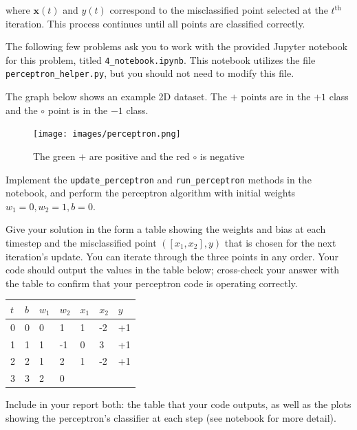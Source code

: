 where $\mathbf{x}(t)$ and $y(t)$ correspond to the misclassified point selected at the $t^\text{th}$ iteration.
This process continues until all points are classified correctly.

The following few problems ask you to work with the provided Jupyter notebook for this problem, titled \texttt{4_notebook.ipynb}. This notebook utilizes the file \texttt{perceptron_helper.py}, but you should not need to modify this file.

\begin{problem}[8]
  The graph below shows an example 2D dataset. The $+$ points are in the $+1$ class and the $\circ$ point is in the $-1$ class. 

  \begin{figure}[H]
    \centering
    \texttt{[image: images/perceptron.png]}
    \caption{The green $+$ are positive and the red $\circ$ is negative}
    \label{fig:figure1}
  \end{figure}
  
 Implement the \texttt{update_perceptron} and \texttt{run_perceptron} methods in the notebook, and perform the perceptron algorithm with initial weights $w_1 = 0, w_2 = 1, b = 0$.

  Give your solution in the form a table showing the weights and bias at each timestep and the misclassified point $([x_1,x_2],y)$ that is chosen for the next iteration's update. You can iterate through the three points in any order. Your code should output the values in the table below; cross-check your answer with the table to confirm that your perceptron code is operating correctly.

  \begin{table}[H]
    \centering

    \begin{tabular}{l|lll|ll|l}
    \hline

    \hline
    $t$ & $b$ & $w_1$ & $w_2$ & $x_1$ & $x_2$ & $y$ \\
    \hline
      0  &  0 & 0 & 1  & 1 & -2 & +1\\
      1  &  1 & 1 & -1 & 0 & 3 & +1\\
      2  &  2 & 1 & 2 & 1 & -2 & +1\\
      3  &  3 & 2 & 0 \\
    \hline
    \end{tabular}
  \end{table}
  
  Include in your report both: the table that your code outputs, as well as the plots showing the perceptron's classifier at each step (see notebook for more detail).
  
  
\end{problem}
